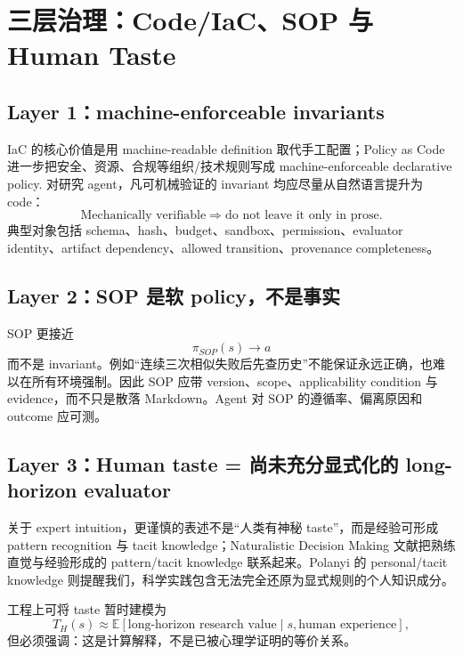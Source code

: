\documentclass[11pt,a4paper]{ctexart}
\newcommand{\E}{\mathbb{E}}
\begin{document}
\section{三层治理：Code/IaC、SOP 与 Human Taste}

\subsection{Layer 1：machine-enforceable invariants}

IaC 的核心价值是用 machine-readable definition 取代手工配置\parencite{rahman2021iac}；Policy as Code 进一步把安全、资源、合规等组织/技术规则写成 machine-enforceable declarative policy\parencite{serra2026policy}. 对研究 agent，凡可机械验证的 invariant 均应尽量从自然语言提升为 code：
\begin{equation}
\boxed{\text{Mechanically verifiable}\Rightarrow\text{do not leave it only in prose}.}
\end{equation}
典型对象包括 schema、hash、budget、sandbox、permission、evaluator identity、artifact dependency、allowed transition、provenance completeness。

\subsection{Layer 2：SOP 是软 policy，不是事实}

SOP 更接近
\begin{equation}
 \pi_{SOP}(s)\to a
\end{equation}
而不是 invariant。例如“连续三次相似失败后先查历史”不能保证永远正确，也难以在所有环境强制。因此 SOP 应带 version、scope、applicability condition 与 evidence，而不只是散落 Markdown。Agent 对 SOP 的遵循率、偏离原因和 outcome 应可测。

\subsection{Layer 3：Human taste = 尚未充分显式化的 long-horizon evaluator}

关于 expert intuition，更谨慎的表述不是“人类有神秘 taste”，而是经验可形成 pattern recognition 与 tacit knowledge；Naturalistic Decision Making 文献把熟练直觉与经验形成的 pattern/tacit knowledge 联系起来\parencite{patterson2010tacit,klein2015intuition}。Polanyi 的 personal/tacit knowledge 则提醒我们，科学实践包含无法完全还原为显式规则的个人知识成分\parencite{polanyi1958personal}。

工程上可将 taste 暂时建模为
\begin{equation}
 T_H(s)\approx \E[\text{long-horizon research value}\mid s,\text{human experience}],
\end{equation}
但必须强调：这是计算解释，不是已被心理学证明的等价关系。
\end{document}
